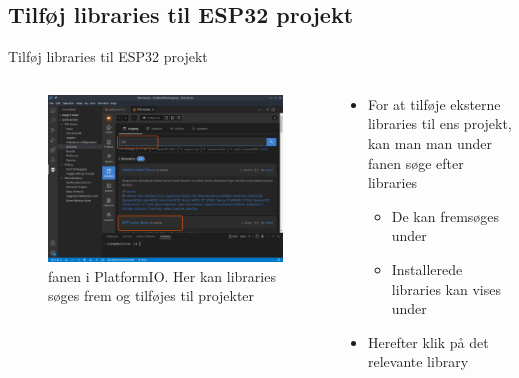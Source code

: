 \documentclass[aspectratio=169]{beamer}
\begin{document}
\subsection{Tilføj libraries til ESP32 projekt}
\begin{frame}{Tilføj libraries til ESP32 projekt}
\begin{columns}
	\begin{column}{0.5\textwidth}
		\begin{figure}
  			\includegraphics[width=\textwidth,keepaspectratio=true]{assets/pictures/pio-libraries.png}
  			\caption{ fanen i PlatformIO. Her kan libraries søges frem og tilføjes til projekter}
  			\label{fig:pio-libraries}
		\end{figure}
	\end{column}
	\begin{column}{0.5\textwidth}
		\begin{textBox}
			\begin{itemize}
				\item For at tilføje eksterne libraries til ens projekt, kan man man under  fanen søge efter libraries
				\begin{itemize}
					\item De kan fremsøges under 
					\item Installerede libraries kan vises under 
				\end{itemize}
				\item Herefter klik på det relevante library
			\end{itemize}
		\end{textBox}
	\end{column}
\end{columns}
\end{frame}
\end{document}
